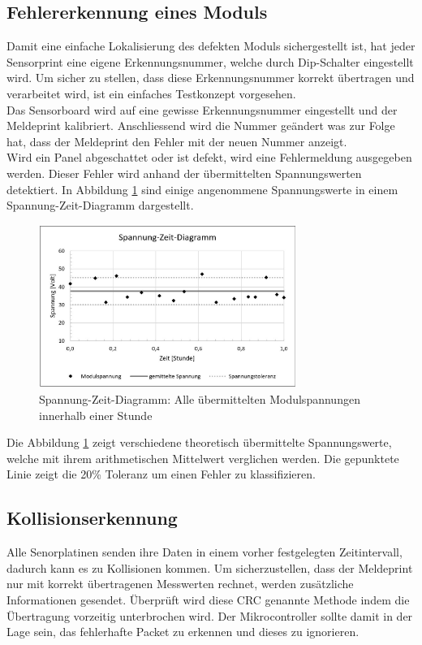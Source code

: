 \subsection{Fehlererkennung eines Moduls}
Damit eine einfache Lokalisierung des defekten Moduls sichergestellt ist, hat jeder Sensorprint eine eigene Erkennungsnummer, welche durch Dip-Schalter eingestellt wird. Um sicher zu stellen, dass diese Erkennungsnummer korrekt übertragen und verarbeitet wird, ist ein einfaches Testkonzept vorgesehen. \\
Das Sensorboard wird auf eine gewisse Erkennungsnummer eingestellt und der Meldeprint kalibriert. Anschliessend wird die Nummer geändert was zur Folge hat, dass der Meldeprint den Fehler mit der neuen Nummer anzeigt.\\

Wird ein Panel abgeschattet oder ist defekt, wird eine Fehlermeldung ausgegeben werden. Dieser Fehler wird anhand der übermittelten Spannungswerten detektiert. In Abbildung \ref{fig:failurecalc-diagram} sind einige angenommene Spannungswerte in einem Spannung-Zeit-Diagramm dargestellt. 

\begin{figure}[htbp] 
  \centering
     \includegraphics[width=0.75\textwidth]{graphics/failurecalc-diagram}
  \caption{Spannung-Zeit-Diagramm: Alle übermittelten Modulspannungen innerhalb einer Stunde}
  \label{fig:failurecalc-diagram}
\end{figure}
Die Abbildung \ref{fig:failurecalc-diagram} zeigt verschiedene theoretisch übermittelte Spannungswerte, welche mit ihrem arithmetischen Mittelwert verglichen werden. Die gepunktete Linie zeigt die 20\% Toleranz um einen Fehler zu klassifizieren.
\subsection{Kollisionserkennung}
Alle Senorplatinen senden ihre Daten in einem vorher festgelegten Zeitintervall, dadurch kann es zu Kollisionen kommen. Um sicherzustellen, dass der Meldeprint nur mit korrekt übertragenen Messwerten rechnet, werden zusätzliche Informationen gesendet. Überprüft wird diese CRC genannte Methode indem die Übertragung vorzeitig unterbrochen wird. Der Mikrocontroller sollte damit in der Lage sein, das fehlerhafte Packet zu erkennen und dieses zu ignorieren.\\

